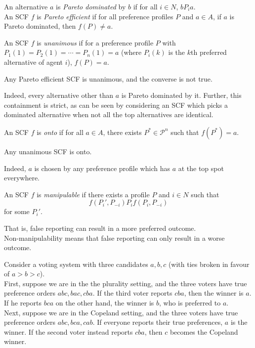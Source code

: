 	\begin{fdef}
		An alternative $a$ is \emph{Pareto dominated} by $b$ if for all $i \in N$, $b P_i a$.\\
		An SCF $f$ is \emph{Pareto efficient} if for all preference profiles $P$ and $a \in A$, if $a$ is Pareto dominated, then $f(P) \ne a$.
	\end{fdef}

	\begin{fdef}[Unanimity]
		An SCF $f$ is \emph{unanimous} if for a preference profile $P$ with $P_1(1) = P_2(1) = \cdots = P_n(1) = a$ (where $P_i(k)$ is the $k$th preferred alternative of agent $i$), $f(P) = a$.
	\end{fdef}

	\begin{prop}
		Any Pareto efficient SCF is unanimous, and the converse is not true.
	\end{prop}
	Indeed, every alternative other than $a$ is Pareto dominated by it. Further, this containment is strict, as can be seen by considering an SCF which picks a dominated alternative when not all the top alternatives are identical.

	\begin{fdef}[Ontoness]
		An SCF $f$ is \emph{onto} if for all $a \in A$, there exists $P^* \in \mathcal{P}^n$ such that $f(P^*) = a$.
	\end{fdef}

	\begin{prop}
		Any unanimous SCF is onto.
	\end{prop}
	Indeed, $a$ is chosen by any preference profile which has $a$ at the top spot everywhere.

	\begin{fdef}[Manipulability]
		An SCF $f$ is \emph{manipulable} if there exists a profile $P$ and $i \in N$ such that
		\[ f(P_i',P_{-i}) P_i f(P_i,P_{-i}) \]
		for some $P_i'$.
	\end{fdef}
	That is, false reporting can result in a more preferred outcome.\\
	Non-manipulability means that false reporting can only result in a worse outcome.

	\begin{fex}[Manipulability]
		Consider a voting system with three candidates $a,b,c$ (with ties broken in favour of $a > b > c$). \\
		First, suppose we are in the the plurality setting, and the three voters have true preference orders $abc, bac, cba$. If the third voter reports $cba$, then the winner is $a$. If he reports $bca$ on the other hand, the winner is $b$, who is preferred to $a$.\\
		Next, suppose we are in the Copeland setting, and the three voters have true preference orders $abc,bca,cab$. If everyone reports their true preferences, $a$ is the winner. If the second voter instead reports $cba$, then $c$ becomes the Copeland winner. 
	\end{fex}

